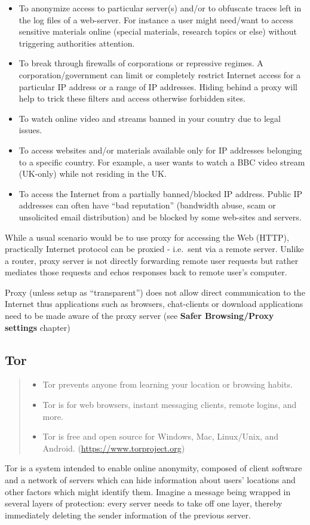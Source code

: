 \begin{itemize}
\item
  To anonymize access to particular server(s) and/or to obfuscate traces
  left in the log files of a web-server. For instance a user might
  need/want to access sensitive materials online (special materials,
  research topics or else) without triggering authorities attention.
\item
  To break through firewalls of corporations or repressive regimes. A
  corporation/government can limit or completely restrict Internet
  access for a particular IP address or a range of IP addresses. Hiding
  behind a proxy will help to trick these filters and access otherwise
  forbidden sites.
\item
  To watch online video and streams banned in your country due to legal
  issues.
\item
  To access websites and/or materials available only for IP addresses
  belonging to a specific country. For example, a user wants to watch a
  BBC video stream (UK-only) while not residing in the UK.
\item
  To access the Internet from a partially banned/blocked IP address.
  Public IP addresses can often have ``bad reputation'' (bandwidth
  abuse, scam or unsolicited email distribution) and be blocked by some
  web-sites and servers.
\end{itemize}
While a usual scenario would be to use proxy for accessing the Web
(HTTP), practically Internet protocol can be proxied - i.e.~sent via a
remote server. Unlike a router, proxy server is not directly forwarding
remote user requests but rather mediates those requests and echos
responses back to remote user's computer.

Proxy (unless setup as ``transparent'') does not allow direct
communication to the Internet thus applications such as browsers,
chat-clients or download applications need to be made aware of the proxy
server (see \textbf{Safer Browsing/Proxy settings} chapter)

\subsection{Tor}

\begin{quote}
\begin{itemize}
\item
  Tor prevents anyone from learning your location or browsing habits.
\item
  Tor is for web browsers, instant messaging clients, remote logins, and
  more.
\item
  Tor is free and open source for Windows, Mac, Linux/Unix, and Android.
  (\href{https://www.torproject.org}{https://www.torproject.org})
\end{itemize}
\end{quote}
Tor is a system intended to enable online anonymity, composed of client
software and a network of servers which can hide information about
users' locations and other factors which might identify them. Imagine a
message being wrapped in several layers of protection: every server
needs to take off one layer, thereby immediately deleting the sender
information of the previous server.

